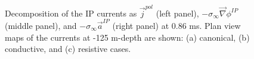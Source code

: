 \documentclass[extra,mreferee]{gji}
\newcommand{\grad}{\vec \nabla}
\newcommand{\siginf}{\sigma_\infty}
\renewcommand {\j}  { {\vec j} }
\begin{document}
\begin{figure}
  \caption{Decomposition of the IP currents as $\j^{pol}$ (left panel), $-\siginf\grad \phi^{IP}$ (middle panel), and $-\siginf\vec{a}^{IP}$ (right panel) at 0.86 ms. Plan view maps of the currents at -125 m-depth are shown: (a) canonical, (b) conductive, and (c) resistive cases. }
  \label{F:IPcurrents_helmholtz_early}
\end{figure}
\end{document}

